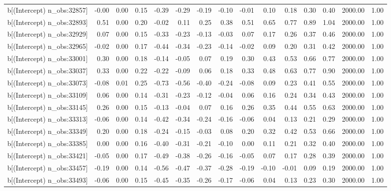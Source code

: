 \begin{table}[ht]
\begin{tabular}{rrrrrrrrrrrrrrr}
  b[(Intercept) n\_obs:32857] & -0.00 & 0.00 & 0.15 & -0.39 & -0.29 & -0.19 & -0.10 & -0.01 & 0.10 & 0.18 & 0.30 & 0.40 & 2000.00 & 1.00 \\ 
  b[(Intercept) n\_obs:32893] & 0.51 & 0.00 & 0.20 & -0.02 & 0.11 & 0.25 & 0.38 & 0.51 & 0.65 & 0.77 & 0.89 & 1.04 & 2000.00 & 1.00 \\ 
  b[(Intercept) n\_obs:32929] & 0.07 & 0.00 & 0.15 & -0.33 & -0.23 & -0.13 & -0.03 & 0.07 & 0.17 & 0.26 & 0.37 & 0.46 & 2000.00 & 1.00 \\ 
  b[(Intercept) n\_obs:32965] & -0.02 & 0.00 & 0.17 & -0.44 & -0.34 & -0.23 & -0.14 & -0.02 & 0.09 & 0.20 & 0.31 & 0.42 & 2000.00 & 1.00 \\ 
  b[(Intercept) n\_obs:33001] & 0.30 & 0.00 & 0.18 & -0.14 & -0.05 & 0.07 & 0.19 & 0.30 & 0.43 & 0.53 & 0.66 & 0.77 & 2000.00 & 1.00 \\ 
  b[(Intercept) n\_obs:33037] & 0.33 & 0.00 & 0.22 & -0.22 & -0.09 & 0.06 & 0.18 & 0.33 & 0.48 & 0.63 & 0.77 & 0.90 & 2000.00 & 1.00 \\ 
  b[(Intercept) n\_obs:33073] & -0.08 & 0.01 & 0.25 & -0.73 & -0.56 & -0.40 & -0.24 & -0.08 & 0.09 & 0.23 & 0.41 & 0.55 & 2000.00 & 1.00 \\ 
  b[(Intercept) n\_obs:33109] & 0.06 & 0.00 & 0.14 & -0.31 & -0.23 & -0.12 & -0.04 & 0.06 & 0.16 & 0.24 & 0.34 & 0.43 & 2000.00 & 1.00 \\ 
  b[(Intercept) n\_obs:33145] & 0.26 & 0.00 & 0.15 & -0.13 & -0.04 & 0.07 & 0.16 & 0.26 & 0.35 & 0.44 & 0.55 & 0.63 & 2000.00 & 1.00 \\ 
  b[(Intercept) n\_obs:33313] & -0.06 & 0.00 & 0.14 & -0.42 & -0.34 & -0.24 & -0.16 & -0.06 & 0.04 & 0.13 & 0.21 & 0.29 & 2000.00 & 1.00 \\ 
  b[(Intercept) n\_obs:33349] & 0.20 & 0.00 & 0.18 & -0.24 & -0.15 & -0.03 & 0.08 & 0.20 & 0.32 & 0.42 & 0.53 & 0.66 & 2000.00 & 1.00 \\ 
  b[(Intercept) n\_obs:33385] & 0.00 & 0.00 & 0.16 & -0.40 & -0.31 & -0.21 & -0.10 & 0.00 & 0.11 & 0.21 & 0.32 & 0.40 & 2000.00 & 1.00 \\ 
  b[(Intercept) n\_obs:33421] & -0.05 & 0.00 & 0.17 & -0.49 & -0.38 & -0.26 & -0.16 & -0.05 & 0.07 & 0.17 & 0.28 & 0.39 & 2000.00 & 1.00 \\ 
  b[(Intercept) n\_obs:33457] & -0.19 & 0.00 & 0.14 & -0.56 & -0.47 & -0.37 & -0.28 & -0.19 & -0.10 & -0.01 & 0.09 & 0.19 & 2000.00 & 1.00 \\ 
  b[(Intercept) n\_obs:33493] & -0.06 & 0.00 & 0.15 & -0.45 & -0.35 & -0.26 & -0.17 & -0.06 & 0.04 & 0.13 & 0.23 & 0.30 & 2000.00 & 1.00 \\ 

\end{tabular}
\end{table}
